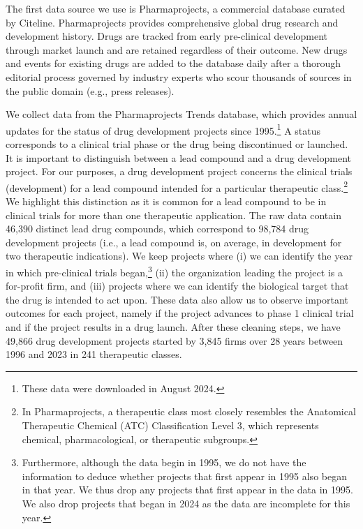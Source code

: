 
The first data source we use is Pharmaprojects, a commercial database curated by Citeline. Pharmaprojects provides comprehensive global drug research and development history. Drugs are tracked from early pre-clinical development through market launch and are retained regardless of their outcome. New drugs and events for existing drugs are added to the database daily after a thorough editorial process governed by industry experts who scour thousands of sources in the public domain (e.g., press releases).

We collect data from the Pharmaprojects Trends database, which provides annual updates for the status of drug development projects since 1995.\footnote{These data were downloaded in August 2024.} A status corresponds to a clinical trial phase or the drug being discontinued or launched. It is important to distinguish between a lead compound and a drug development project. For our purposes, a drug development project concerns the clinical trials (development) for a lead compound intended for a particular therapeutic class.\footnote{In Pharmaprojects, a therapeutic class most closely resembles the Anatomical Therapeutic Chemical (ATC) Classification Level 3, which represents chemical, pharmacological, or therapeutic subgroups.} We highlight this distinction as it is common for a lead compound to be in clinical trials for more than one therapeutic application. The raw data contain 46,390 distinct lead drug compounds, which correspond to 98,784 drug development projects (i.e., a lead compound is, on average, in development for two therapeutic indications). We keep projects where (i) we can identify the year in which pre-clinical trials began,\footnote{Furthermore, although the data begin in 1995, we do not have the information to deduce whether projects that first appear in 1995 also began in that year. We thus drop any projects that first appear in the data in 1995. We also drop projects that began in 2024 as the data are incomplete for this year.} (ii) the organization leading the project is a for-profit firm, and (iii) projects where we can identify the biological target that the drug is intended to act upon. These data also allow us to observe important outcomes for each project, namely if the project advances to phase 1 clinical trial and if the project results in a drug launch. After these cleaning steps, we have 49,866 drug development projects started by 3,845 firms over 28 years between 1996 and 2023 in 241 therapeutic classes.

